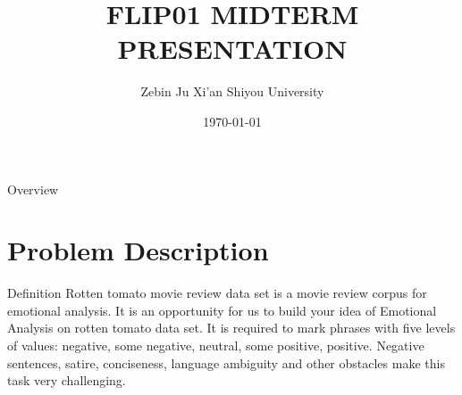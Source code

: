 \documentclass[
 size=12pt,
 paper=smartboard, %
 mode=present, %
 display=slides, %
style=tuliplab,
pauseslide,
fleqn,leqno]{powerdot}
\title{FLIP01 MIDTERM PRESENTATION}
\author{Zebin Ju
Xi'an Shiyou University 
}
\date{\today}
\begin{document}
\maketitle 
\begin{slide}[toc=,bm=]{Overview}
  \tableofcontents[content=sections]
\end{slide}

  \section{Problem Description}

  \begin{slide}{Definition}
  Rotten tomato movie review data set is a movie review corpus for emotional analysis. It is an opportunity for us to build your idea of Emotional Analysis on rotten tomato data set. It is required to mark phrases with five levels of values: negative, some negative, neutral, some positive, positive. Negative sentences, satire, conciseness, language ambiguity and other obstacles make this task very challenging.
    \


\end{slide}
\end{document}
